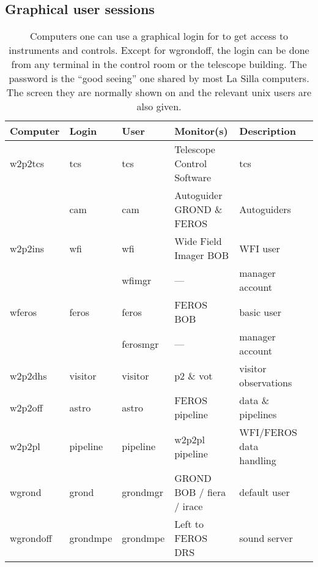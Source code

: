 \documentclass[11pt,fleqn,a4paper]{book}
\begin{document}
\subsection{Graphical user sessions}
\begin{table}
    \caption[Main workstations and users]{Computers one can use a graphical login for to get access to instruments and controls. Except for wgrondoff, the login can be done from any terminal in the control room or the telescope building.  The password is the ``good seeing'' one shared by most  La Silla computers. The screen they are normally shown on and the relevant unix users are also given.  }
\label{fig:computers}
\centering
\begin{tabular}{llllll}
\hline
Computer        & Login    & User     & Monitor(s)                 & Description\\\hline\hline
\gls{w2p2tcs}   & tcs      & tcs      & Telescope Control Software & \gls{tcs}\\
                & cam      & cam      & Autoguider GROND \& FEROS  & Autoguiders\\
\gls{w2p2ins}   & wfi      & wfi      & Wide Field Imager BOB      & WFI user\\
                &          & wfimgr   & ---                        & manager account\\
\gls{wferos}    & feros    & feros    & FEROS BOB                  & basic user\\
                &          & ferosmgr & ---                        & manager account\\
\gls{w2p2dhs}   & visitor  & visitor  & \gls{p2} \& \gls{vot}      & \gls{visitor} observations\\
\gls{w2p2off}   & astro    & astro    & FEROS pipeline             & data \& pipelines\\
\gls{w2p2pl}    & pipeline & pipeline & w2p2pl pipeline            & WFI/FEROS data handling\\       
\gls{wgrond}    & grond    & grondmgr & GROND BOB / \gls{fiera} / \gls{irace}  & default user\\
\hline
\gls{wgrondoff} & grondmpe & grondmpe & Left to FEROS DRS          & sound server\\
\hline
\end{tabular}
\end{table}
\end{document}
